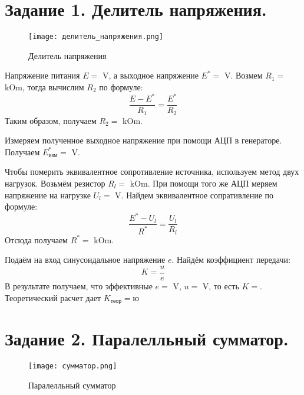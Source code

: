 



    

    \section*{Задание 1. Делитель напряжения.}

    \begin{figure}[h!]
        \centering
        \texttt{[image: делитель\_напряжения.png]}
        \caption{Делитель напряжения}
    \end{figure}

    \noindent Напряжение питания $E = $ V, а выходное напряжение $E^* = $ V. 
    Возмем $R_1 = $ kOm, тогда вычислим $R_2$ по формуле:
    \begin{equation*}
        \frac{E - E^*}{R_1} = \frac{E^*}{R_2}
    \end{equation*} 
    Таким образом, получаем $R_2 = $ kOm.

    \noindent Измеряем полученное выходное напряжение при помощи АЦП в
    генераторе. Получаем $E^*_{\text{изм}} = $ V.

    \noindent Чтобы померить эквивалентное сопротивление источника, используем метод двух нагрузок. 
    Возьмём резистор $R_l = $ kOm. 
    При помощи того же АЦП меряем напряжение на нагрузке $U_l = $ V.
    Найдем эквивалентное сопративление по формуле:
    \begin{equation*}
        \frac{E^* - U_l}{R^*} = \frac{U_l}{R_l}
    \end{equation*} 
    Отсюда получаем $R^* = $ kOm.

    \noindent Подаём на вход синусоидальное напряжение $e$. 
    Найдём коэффициент передачи:
    \begin{equation*}
        K = \frac{u}{e}
    \end{equation*} 
    В результате получаем, что эффективные $e = $ V, $u = $ V, то есть $K = $.
    Теоретический расчет дает $K_{\text{теор}} = $ю

    \section*{Задание 2. Паралелльный сумматор.}

    \begin{figure}[h!]
        \centering
        \texttt{[image: сумматор.png]}
        \caption{Паралелльный сумматор}
    \end{figure}

